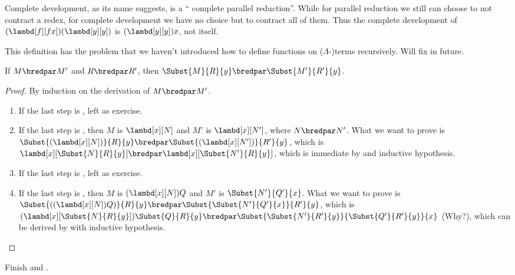 \documentclass[../../../include/open-logic-section]{subfiles}
\begin{document}
Complete development, as its name suggests, is a ``
complete parallel reduction''. While for parallel reduction we still can choose
to not contract a redex, for complete development we have no choice
but to contract all of them. Thus the complete
development of $(\lambd[f][fx])(\lambd[y][y])$ is
$(\lambd[y][y])x$, not itself.

\begin{editorial}
  This definition has the problem that we haven't introduced how to
  define functions on ($\Lambda$-)terms recursively. Will fix in future.
\end{editorial}

\begin{lem}
  If $M \bredpar M'$ and $R \bredpar R'$, then $\Subst{M}{R}{y}
  \bredpar \Subst{M'}{R'}{y}$.
\end{lem}
\begin{proof}
  By induction on the derivation of $M \bredpar M'$.
  \begin{enumerate}
    \item If the last step is , left as exercise. 
    \item If the last step is , then $M$ is 
      $\lambd[x][N]$ and $M'$ is $\lambd[x][N']$,
      where $N \bredpar N'$. What we want to prove is
      $\Subst{(\lambd[x][N])}{R}{y} \bredpar
      \Subst{(\lambd[x][N'])}{R'}{y}$, which is
      $\lambd[x][\Subst{N}{R}{y}] \bredpar
      \lambd[x][\Subst{N'}{R}{y}]$, which is immediate by
       and inductive hypothesis.
    \item If the last step is , left as exercise. 
    \item If the last step is , then $M$ is
      $(\lambd[x][N])Q$ and $M'$ is $\Subst{N'}{Q'}{x}$. What
      we want to prove is $\Subst{((\lambd[x][N])Q)}{R}{y}
      \bredpar \Subst{\Subst{N'}{Q'}{x}}{R'}{y}$, which is
      $(\lambd[x][\Subst{N}{R}{y}])\Subst{Q}{R}{y} \bredpar
      \Subst{\Subst{N'}{R'}{y}}{\Subst{Q'}{R'}{y}}{x}$ (Why?), which
      can be derived by  with inductive hypothesis.
  \end{enumerate}
\end{proof}

\begin{prob}
  Finish  and .
\end{prob}
\end{document}
